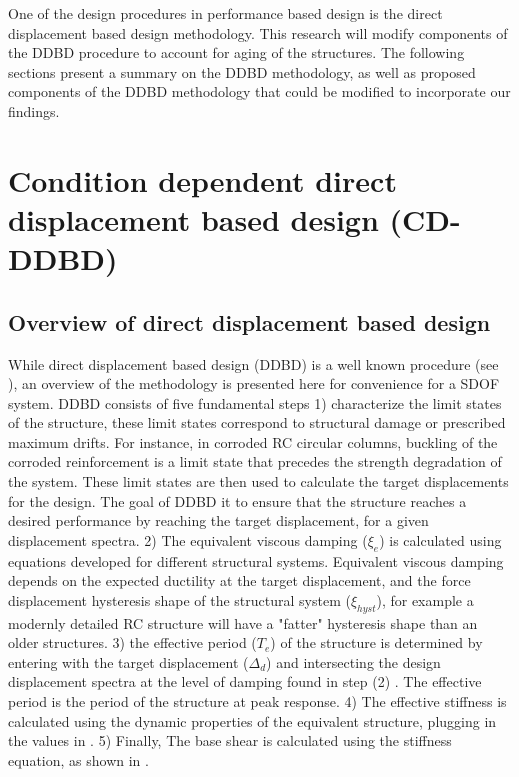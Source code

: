 One of the design procedures in performance  based design is the direct displacement based design methodology. This research will modify components of the DDBD procedure to account for aging of the structures. The following sections present a summary on the DDBD methodology, as well as proposed components of the DDBD methodology that could be modified to incorporate our findings.

\section{Condition dependent direct displacement based design (CD-DDBD)}
\subsection{Overview of direct displacement based design}

While direct displacement based design (DDBD) is a well known procedure (see \cite{Priestley2007}), an overview of the methodology is presented here for convenience for a SDOF system. DDBD consists of five fundamental steps 1) characterize the limit states of the structure, these limit states correspond to structural damage or prescribed maximum drifts. For instance, in corroded RC circular columns, buckling of the corroded reinforcement is a limit state that precedes the strength degradation of the system. These limit states are then used to calculate the target displacements for the design. The goal of DDBD it to ensure that the structure reaches a desired performance by reaching the target displacement, for a given displacement spectra.  2) The equivalent viscous damping ($\xi_e$) is calculated using equations developed for different structural systems. Equivalent viscous damping depends on the expected ductility at the target displacement, and the force displacement hysteresis shape of the structural system ($\xi_{hyst}$), for example a modernly detailed RC structure will have a "fatter" hysteresis shape than an older structures. 3)  the effective period ($T_e$) of the structure is determined by entering with the target displacement ($\Delta_d$) and intersecting the design displacement spectra at the level of damping found in step (2) . The effective period is  the period of the structure at peak response. 4) The effective stiffness is calculated using the dynamic properties of the equivalent structure, plugging in the values in . 5) Finally, The base shear is calculated using the stiffness equation, as shown in .

